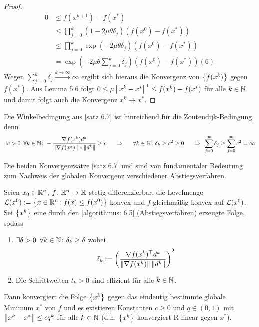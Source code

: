 \begin{proof}
\begin{equation}
\begin{aligned}
		0 &\le f(x^{k+1}) - f(x^\ast) \\
		&\le \prod_{j=0}^k (1-2 \mu \theta \delta_j) (f(x^0) - f(x^\ast)) \\
		&\le \prod_{j=0}^{k} \exp(-2\mu\theta \delta_j) (f(x^0) - f(x^\ast)) \\
		&= \exp \left( -2 \mu \theta \sum_{j=0}^k \delta_j \right) (f(x^0) - f(x^\ast))                          (6)
		\end{aligned}
	\end{equation}
	Wegen $\sum_{j=0}^k \delta_j \overset{k \to \infty}{\longrightarrow} \infty$ ergibt sich hieraus die Konvergenz von $\left\{ f(x^k) \right\}_{}$ gegen $f(x^\ast)$. Aus Lemma 5.6 folgt $0 \le \mu \left\lVert x^k - x^\ast \right\rVert^1 \le f(x^k) - f(x^\ast)$ für alle $k \in \mathbb{N}$ und damit folgt auch die Konvergenz $x^k \to x^\ast$.
\end{proof}

\begin{bemerkung}
	Die Winkelbedingung aus \cref{satz 6.7} ist hinreichend für die Zoutendijk-Bedingung, denn 
	\begin{equation*}
		\exists c > 0 \enskip \forall k \in \mathbb{N} \colon - \frac{\nabla f(x^k) d^k}{\left\lVert \nabla f(x^k) \right\rVert * \left\lVert d^k \right\rVert} \ge c \quad \enskip \Rightarrow \enskip \quad \forall k \in \mathbb{N} \colon \delta_k \ge c^2 \ge 0 \quad \enskip \Rightarrow \enskip \sum_{j=0}^\infty \delta_j \ge \sum_{j=0}^\infty c^2 = \infty
	\end{equation*}
\end{bemerkung}

\begin{bemerkung}
	Die beiden Konvergenzsätze \cref{satz 6.7} und  sind von fundamentaler Bedeutung zum Nachweis der globalen Konvergenz verschiedener Abstiegsverfahren.
\end{bemerkung}

\begin{folgerung}
	Seien $x_0 \in \mathbb{R}^n$, $\abb{f}{\R^n}{\R}$ stetig differenzierbar, die Levelmenge $\mathcal{L}(x^0) \mathrel{:=} \left\{ x \in \mathbb{R}^n \colon f(x) \le f(x^0) \right\}$ konvex und $f$ gleichmäßig konvex auf $\mathcal{L}(x^0)$. Sei $\left\{ x^k \right\}_{}$ eine durch den \cref{algorithmus: 6.5} (Abstiegsverfahren) erzeugte Folge, sodass
	\begin{enumerate}
		\item $\exists \delta > 0 \enskip \forall k \in \mathbb{N} \colon \delta_k \ge \delta$ wobei
		\begin{equation*}
		\delta_k \mathrel{:=} \left( \frac{\nabla f(x^k)^{\top} d^k}{\left\lVert \nabla f(x^k) \right\rVert \left\lVert d^k \right\rVert} \right)^2
		\end{equation*}
		\item Die Schrittweiten $t_k > 0$ sind effizient für alle $k \in \mathbb{N}$. 
	\end{enumerate}
	Dann konvergiert die Folge $\left\{ x^k \right\}_{}$ gegen das eindeutig bestimmte globale Minimum $x^\ast$ von $f$ und es existieren Konstanten $c \ge 0$ und $q \in (0,1)$ mit $\left\lVert x^k - x^\ast \right\rVert \le cq^k$ für alle $k \in \mathbb{N}$ (d.h. $\left\{ x^k \right\}_{}$ konvergiert R-linear gegen $x^\ast$).
\end{folgerung}

